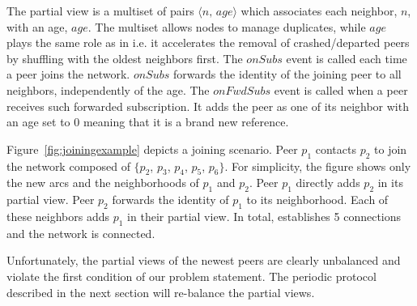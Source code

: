 \begin{algorithm}[h]

\caption{\label{algo:joining}The joining protocol of \SPRAY.}
\end{algorithm}

The partial view is a multiset of pairs $\langle n,\, age\rangle$
which associates each neighbor, $n$, with an age, $age$. The multiset
allows nodes to manage duplicates, while $age$ plays the same role as
in \CYCLON i.e.  it accelerates the removal of crashed/departed peers
by shuffling with the oldest neighbors first. The $onSubs$ event is
called each time a peer joins the network. $onSubs$ forwards the
identity of the joining peer to all neighbors, independently of the
age. The $onFwdSubs$ event is called when a peer receives such
forwarded subscription. It adds the peer as one of its neighbor with
an age set to $0$ meaning that it is a brand new reference.

\begin{figure*}
  \centering
  \hspace{8pt}
  \hspace{8pt}
  \caption{\label{fig:joiningexample}Example of the \SPRAY's joining
    protocol.}
\end{figure*}

Figure~\ref{fig:joiningexample} depicts a joining scenario.  Peer
$p_1$ contacts $p_2$ to join the network composed of $\{p_2$, $p_3$,
$p_4$, $p_5$, $p_6\}$. For simplicity, the figure shows only the new
arcs and the neighborhoods of $p_1$ and $p_2$. Peer $p_1$ directly adds
$p_2$ in its partial view. Peer $p_2$ forwards the identity of $p_1$
to its neighborhood. Each of these neighbors adds $p_1$ in their
partial view. In total, \SPRAY establishes 5 connections and the
network is connected.

Unfortunately, the partial views of the newest peers are clearly unbalanced and
violate the first condition of our problem statement. The periodic protocol
described in the next section will re-balance the partial views.

